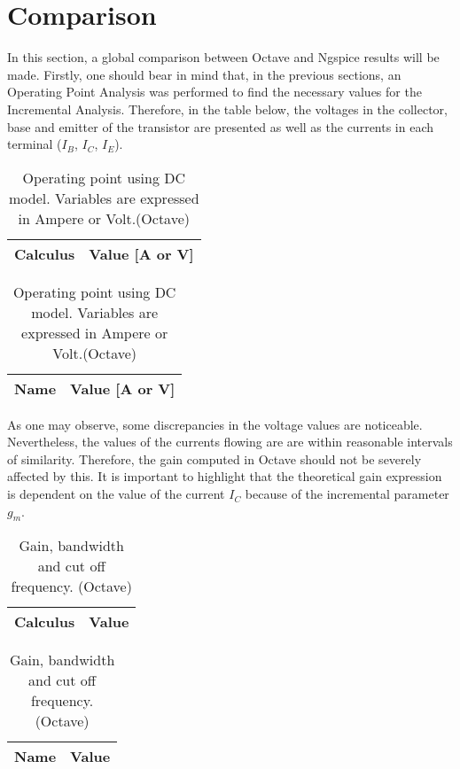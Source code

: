 \section{Comparison}
\label{section:comparison}

\par In this section, a global comparison between Octave and Ngspice results will be made. Firstly, one should bear in mind that, in the previous sections, an Operating Point Analysis was performed to find the necessary values for the Incremental Analysis. Therefore, in the table below, the voltages in the collector, base and emitter of the transistor are presented as well as the currents in each terminal ($I_{B}$, $I_{C}$, $I_{E}$).

\begin{table}[ht]
\parbox{.45\linewidth}{
  \centering
  \begin{tabular}{|l|r|}
    \hline    
    {\bf Calculus} & {\bf Value [A or V]} \\ \hline
    
  \end{tabular}
  \caption{Operating point using DC model. Variables are expressed in Ampere or Volt. (Ngspice)}} 
\parbox{.45\linewidth}{
 \centering
  \begin{tabular}{|l|r|}
    \hline    
    {\bf Name} & {\bf Value [A or V]} \\ \hline
    
  \end{tabular}
  \caption{Operating point using DC model. Variables are expressed in Ampere or Volt.(Octave)}}
\end{table}

\par As one may observe, some discrepancies in the voltage values are noticeable. Nevertheless, the values of the currents flowing are are within reasonable intervals of similarity. Therefore, the gain computed in Octave should not be severely affected by this. It is important to highlight that the theoretical gain expression is dependent on the value of the current $I_{C}$ because of the incremental parameter $g_{m}$. 
\newpage
 \begin{table}[h]
\parbox{.45\linewidth}{
  \centering
  \begin{tabular}{|l|r|}
    \hline    
    {\bf Calculus} & {\bf Value} \\ \hline
    
  \end{tabular}
  \caption{Gain, bandwidth and cut off frequency. (Ngspice)}} 
\parbox{.45\linewidth}{
 \centering
  \begin{tabular}{|l|r|}
    \hline    
    {\bf Name} & {\bf Value} \\ \hline
    
  \end{tabular}
  \caption{Gain, bandwidth and cut off frequency. (Octave)}}
\end{table}


